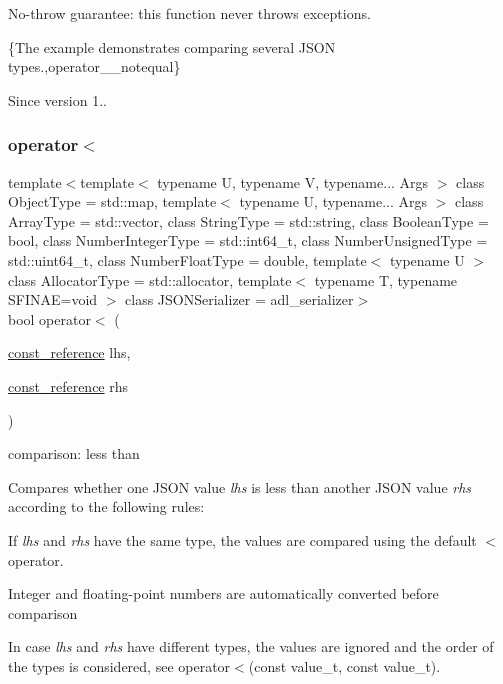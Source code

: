 No-\/throw guarantee\+: this function never throws exceptions.

\{The example demonstrates comparing several J\+S\+ON types.,operator\+\_\+\+\_\+notequal\}

\begin{DoxySince}{Since}
version 1.. 
\end{DoxySince}
\mbox{\label{classnlohmann_1_1basic__json_aacd442b66140c764c594ac8ad7dfd5b3}} 
\subsubsection{\texorpdfstring{operator$<$}{operator<}\hspace{0.1cm}{\footnotesize\ttfamily [1/3]}}
{\footnotesize\ttfamily template$<$template$<$ typename U, typename V, typename... Args $>$ class Object\+Type = std\+::map, template$<$ typename U, typename... Args $>$ class Array\+Type = std\+::vector, class String\+Type  = std\+::string, class Boolean\+Type  = bool, class Number\+Integer\+Type  = std\+::int64\+\_\+t, class Number\+Unsigned\+Type  = std\+::uint64\+\_\+t, class Number\+Float\+Type  = double, template$<$ typename U $>$ class Allocator\+Type = std\+::allocator, template$<$ typename T, typename S\+F\+I\+N\+A\+E=void $>$ class J\+S\+O\+N\+Serializer = adl\+\_\+serializer$>$ \\
bool operator$<$ (\begin{DoxyParamCaption}\item[{\mbox{\hyperlink{classnlohmann_1_1basic__json_a4057c5425f4faacfe39a8046871786ca}{const\+\_\+reference}}}]{lhs,  }\item[{\mbox{\hyperlink{classnlohmann_1_1basic__json_a4057c5425f4faacfe39a8046871786ca}{const\+\_\+reference}}}]{rhs }\end{DoxyParamCaption})\hspace{0.3cm}{\ttfamily [friend]}}



comparison\+: less than 

Compares whether one J\+S\+ON value {\itshape lhs} is less than another J\+S\+ON value {\itshape rhs} according to the following rules\+:
\begin{DoxyItemize}
\item If {\itshape lhs} and {\itshape rhs} have the same type, the values are compared using the default {\ttfamily $<$} operator.
\item Integer and floating-\/point numbers are automatically converted before comparison
\item In case {\itshape lhs} and {\itshape rhs} have different types, the values are ignored and the order of the types is considered, see operator$<$(const value\+\_\+t, const value\+\_\+t).
\end{DoxyItemize}


